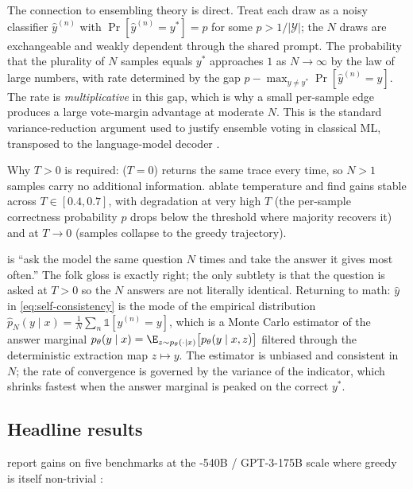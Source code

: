 The connection to ensembling theory is direct. Treat each draw as a
noisy classifier $\hat y^{(n)}$ with $\Pr[\hat y^{(n)} = y^*] = p$ for
some $p > 1/|\mathcal{Y}|$; the $N$ draws are exchangeable and weakly
dependent through the shared prompt. The probability that the
plurality of $N$ samples equals $y^*$ approaches $1$ as $N \to \infty$
by the law of large numbers, with rate determined by the gap
$p - \max_{y \ne y^*} \Pr[\hat y^{(n)} = y]$. The rate is
\emph{multiplicative} in this gap, which is why a small per-sample
edge produces a large vote-margin advantage at moderate $N$. This is
the standard variance-reduction argument used to justify ensemble
voting in classical ML, transposed to the language-model decoder
\citep[\S 3]{wang2022-self-consistency}.

Why $T > 0$ is required:  ($T = 0$) returns the same
trace every time, so $N > 1$ samples carry no additional information.
\citet[\S 4.3]{wang2022-self-consistency} ablate temperature and find
gains stable across $T \in [0.4, 0.7]$, with degradation at very high
$T$ (the per-sample correctness probability $p$ drops below the
threshold where majority recovers it) and at $T \to 0$ (samples
collapse to the greedy trajectory).

\begin{intuition}
 is ``ask the model the same question $N$ times and
take the answer it gives most often.'' The folk gloss is exactly right;
the only subtlety is that the question is asked at $T > 0$ so the $N$
answers are not literally identical. Returning to math: $\hat y$ in
\cref{eq:self-consistency} is the mode of the empirical distribution
$\hat p_N(y \mid x) = \frac{1}{N}\sum_n \mathbb{1}[y^{(n)} = y]$, which
is a Monte Carlo estimator of the answer marginal
$p_\theta(y \mid x) = \E_{z \sim p_\theta(\cdot \mid x)}\bigl[
p_\theta(y \mid x, z)\bigr]$ filtered through the deterministic
extraction map $z \mapsto y$. The estimator is unbiased and consistent
in $N$; the rate of convergence is governed by the variance of the
indicator, which shrinks fastest when the answer marginal is peaked on
the correct $y^*$.
\end{intuition}

\subsection{Headline results}
\label{sec:sc-results}

\citet{wang2022-self-consistency} report gains on five benchmarks at the
-540B / GPT-3-175B scale where greedy  is itself
non-trivial \citep[abstract]{wang2022-self-consistency}:

